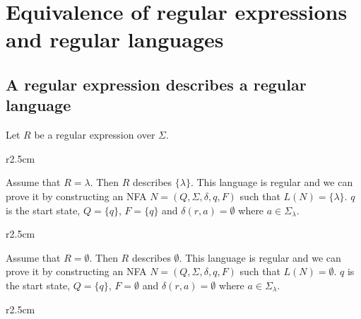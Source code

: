 \documentclass{article}
\newcommand{\emptyString}{\lambda}
\begin{document}
\pagebreak

\section{Equivalence of regular expressions and regular languages}

\subsection{A regular expression describes a regular language}

Let \(R\) be a regular expression over \(\Sigma\).

\begin{wrapfigure}{r}{2.5cm}
\end{wrapfigure}

Assume that \(R=\emptyString\). Then \(R\) describes \(\{\emptyString\}\).
This language is regular and we can prove it by constructing an NFA \(N=(Q, \Sigma, \delta, q, F)\)
such that \(L(N)=\{\emptyString\}\).
\(q\) is the start state, \(Q=\{q\}\), \(F=\{q\}\) and \(\delta(r,a)=\emptyset\)
where \(a\in\Sigma_\emptyString\).
\wrapfill

\begin{wrapfigure}{r}{2.5cm}
\end{wrapfigure}

Assume that \(R=\emptyset\). Then \(R\) describes \(\emptyset\).
This language is regular and we can prove it by constructing an NFA \(N=(Q, \Sigma, \delta, q, F)\)
such that \(L(N)=\emptyset\).
\(q\) is the start state, \(Q=\{q\}\), \(F=\emptyset\) and \(\delta(r,a)=\emptyset\) where \(a\in\Sigma_\emptyString\).
\wrapfill

\begin{wrapfigure}{r}{2.5cm}
\end{wrapfigure}
\end{document}
